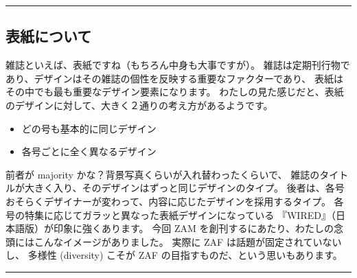 \documentclass[dvipdfmx,autodetect-engine,10pt,b5paper,papersize,openany,dvipsnames]{jsbook}
\begin{document}
\hrule

\begin{multicols}{2}

\section{表紙について}
雑誌といえば、表紙ですね（もちろん中身も大事ですが）。
雑誌は定期刊行物であり、デザインはその雑誌の個性を反映する重要なファクターであり、
表紙はその中でも最も重要なデザイン要素になります。
わたしの見た感じだと、表紙のデザインに対して、大きく２通りの考え方があるようです。
\begin{itemize}
\item どの号も基本的に同じデザイン
\item 各号ごとに全く異なるデザイン
\end{itemize}
前者が majority かな？背景写真くらいが入れ替わったくらいで、
雑誌のタイトルが大きく入り、そのデザインはずっと同じデザインのタイプ。
後者は、各号おそらくデザイナーが変わって、内容に応じたデザインを採用するタイプ。
各号の特集に応じてガラッと異なった表紙デザインになっている
『WIRED』（日本語版）が印象に強くあります。
今回 ZAM を創刊するにあたり、わたしの念頭にはこんなイメージがありました。
実際に ZAF は話題が固定されていないし、
多様性 (diversity) こそが ZAF の目指すものだ、という思いもあります。

\end{multicols}

\hrule

\vspace{6cm}

\end{document}
